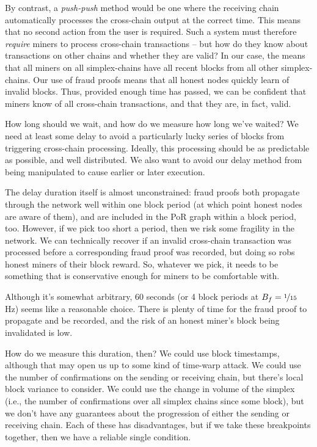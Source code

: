 By contrast, a \emph{push-push} method would be one where the receiving chain automatically processes the cross-chain output at the correct time.
This means that no second action from the user is required.
Such a system must therefore \emph{require} miners to process cross-chain transactions -- but how do they know about transactions on other chains and whether they are valid?
In our case, the \AxiomOfAvailability{} means that all miners on all simplex-chains have all recent blocks from all other simplex-chains.
Our use of fraud proofs means that all honest nodes quickly learn of invalid blocks.
Thus, provided enough time has passed, we can be confident that miners know of all  cross-chain transactions, and that they are, in fact, valid.

How long should we wait, and how do we measure how long we've waited?
We need at least some delay to avoid a particularly lucky series of blocks from triggering cross-chain processing.
Ideally, this processing should be as predictable as possible, and well distributed.
We also want to avoid our delay method from being manipulated to cause earlier or later execution.

The delay duration itself is almost unconstrained: fraud proofs both propagate through the network well within one block period (at which point honest nodes are aware of them), and are included in the PoR graph within a block period, too.
However, if we pick too short a period, then we risk some fragility in the network.
We can technically recover if an invalid cross-chain transaction was processed before a corresponding fraud proof was recorded, but doing so robs honest miners of their block reward.
So, whatever we pick, it needs to be something that is conservative enough for miners to be comfortable with.

Although it's somewhat arbitrary, 60 seconds (or 4 block periods at $B_f = \nicefrac{1}{15}$ Hz) seems like a reasonable choice.
There is plenty of time for the fraud proof to propagate and be recorded, and the risk of an honest miner's block being invalidated is low.

How do we measure this duration, then?
We could use block timestamps, although that may open us up to some kind of time-warp attack.
We could use the number of confirmations on the sending or receiving chain, but there's local block variance to consider.
We could use the change in volume of the simplex (i.e., the number of confirmations over all simplex chains since some block), but we don't have any guarantees about the progression of either the sending or receiving chain.
Each of these has disadvantages, but if we take these breakpoints together, then we have a reliable single condition.

